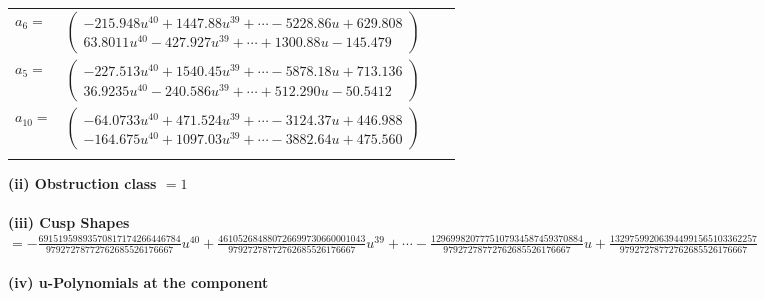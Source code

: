 \documentclass[1p]{elsarticle_modified}
\theoremstyle{definition}
\begin{document}
\begin{tabular}{m{7pt} m{180pt} m{7pt} m{180pt} }
\flushright $a_{6}=$&$\begin{pmatrix}-215.948 u^{40}+1447.88 u^{39}+\cdots-5228.86 u+629.808\\63.8011 u^{40}-427.927 u^{39}+\cdots+1300.88 u-145.479\end{pmatrix}$ \\
\flushright $a_{5}=$&$\begin{pmatrix}-227.513 u^{40}+1540.45 u^{39}+\cdots-5878.18 u+713.136\\36.9235 u^{40}-240.586 u^{39}+\cdots+512.290 u-50.5412\end{pmatrix}$ \\
\flushright $a_{10}=$&$\begin{pmatrix}-64.0733 u^{40}+471.524 u^{39}+\cdots-3124.37 u+446.988\\-164.675 u^{40}+1097.03 u^{39}+\cdots-3882.64 u+475.560\end{pmatrix}$\\&\end{tabular}
\flushleft \textbf{(ii) Obstruction class $= 1$}\\~\\
\flushleft \textbf{(iii) Cusp Shapes $= -\frac{69151959893570817174266446784}{97927278772762685526176667} u^{40}+\frac{461052684880726699730660001043}{97927278772762685526176667} u^{39}+\cdots-\frac{1296998207775107934587459370884}{97927278772762685526176667} u+\frac{132975992063944991565103362257}{97927278772762685526176667}$}\\~\\
\newpage\renewcommand{\arraystretch}{1}
\flushleft \textbf{(iv) u-Polynomials at the component}\newline \\
\end{document}
